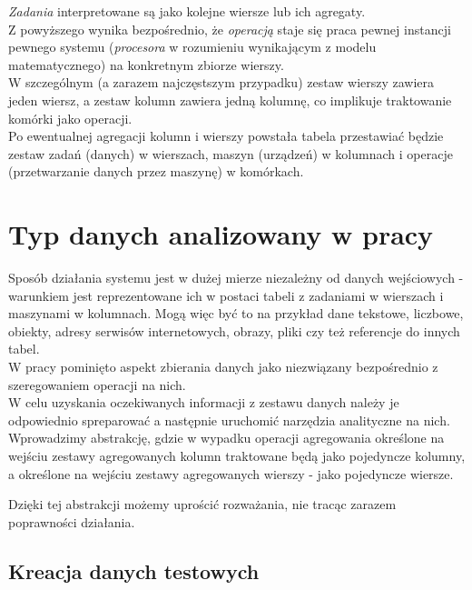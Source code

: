 \documentclass[brudnopis]{xmgr}
\begin{document}
\emph{Zadania} interpretowane są jako kolejne wiersze lub ich agregaty.
\medskip\\

Z powyższego wynika bezpośrednio, że \emph{operacją} staje się praca pewnej instancji pewnego systemu (\emph{procesora} w rozumieniu wynikającym z modelu matematycznego) na konkretnym zbiorze wierszy.
\medskip\\

W szczególnym (a zarazem najczęstszym przypadku) zestaw wierszy zawiera jeden wiersz, a zestaw kolumn zawiera jedną kolumnę, co implikuje traktowanie komórki jako operacji.
\medskip\\

Po ewentualnej agregacji kolumn i wierszy powstała tabela przestawiać będzie zestaw zadań (danych) w wierszach, maszyn (urządzeń) w kolumnach i operacje (przetwarzanie danych przez maszynę) w komórkach.

\chapter{Typ danych analizowany w pracy}

Sposób działania systemu jest w dużej mierze niezależny od danych wejściowych - warunkiem jest reprezentowane ich w postaci tabeli z zadaniami w wierszach i maszynami w kolumnach.
Mogą więc być to na przykład dane tekstowe, liczbowe, obiekty, adresy serwisów internetowych, obrazy, pliki czy też referencje do innych tabel.
\medskip\\

W pracy pominięto aspekt zbierania danych jako niezwiązany bezpośrednio z szeregowaniem operacji na nich.
\medskip\\

W celu uzyskania oczekiwanych informacji z zestawu danych należy je odpowiednio spreparować a następnie uruchomić narzędzia analityczne na nich.
\medskip\\

Wprowadzimy abstrakcję, gdzie w wypadku operacji agregowania określone na wejściu zestawy agregowanych kolumn traktowane będą jako pojedyncze kolumny, a określone na wejściu zestawy agregowanych wierszy - jako pojedyncze wiersze.

Dzięki tej abstrakcji możemy uprościć rozważania, nie tracąc zarazem poprawności działania.

\section{Kreacja danych testowych}
\end{document}
